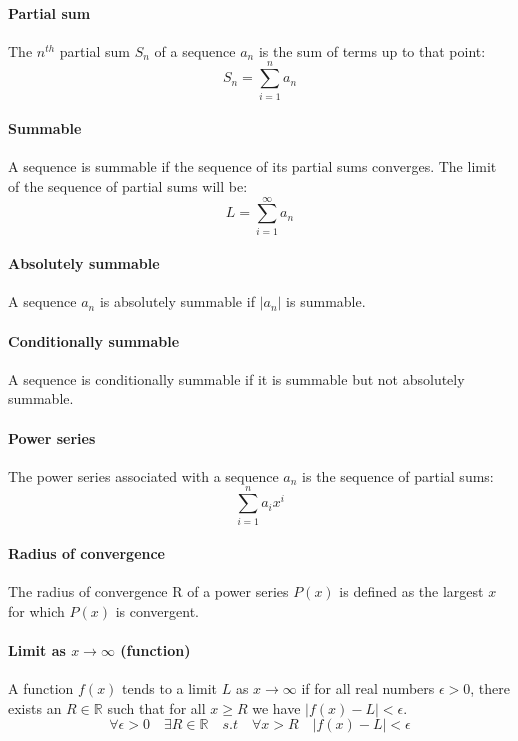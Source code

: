 \documentclass{article}
\newcommand{\R}{\mathbb{R}}
\begin{document}
\paragraph{Partial sum}
The $ n^{th} $ partial sum $ S_{n} $ of a sequence $ a_{n} $ is the sum of terms up to that point:
\begin{equation}
S_{n} = \sum_{i=1}^{n} a_{n}
\end{equation}
\paragraph{Summable}
A sequence is summable if the sequence of its partial sums converges. The limit of the sequence of partial sums will be:
\begin{equation}
L = \sum_{i=1}^{\infty} a_{n}
\end{equation}
\paragraph{Absolutely summable}
A sequence $ a_{n} $ is absolutely summable if $ |a_{n}| $ is summable.
\paragraph{Conditionally summable}
A sequence is conditionally summable if it is summable but not absolutely summable.
\paragraph{Power series}
The power series associated with a sequence $ a_{n} $ is the sequence of partial sums:
\begin{equation}
\sum_{i=1}^{n} a_{i}x^{i}
\end{equation}
\paragraph{Radius of convergence}
The radius of convergence R of a power series $ P(x) $ is defined as the largest $ x $ for which $ P(x) $ is convergent.
\paragraph{Limit as $ x \to \infty $ (function)}
A function $ f(x) $ tends to a limit $ L $ as $ x \to \infty $ if for all real numbers $ \epsilon > 0 $, there exists an $ R \in \R $ such that for all $ x \geq R $ we have $ |f(x) - L| < \epsilon $.
\begin{equation}
\forall \epsilon > 0 \quad \exists R \in \R \quad s.t \quad \forall x > R \quad |f(x) - L| < \epsilon
\end{equation}
\end{document}
